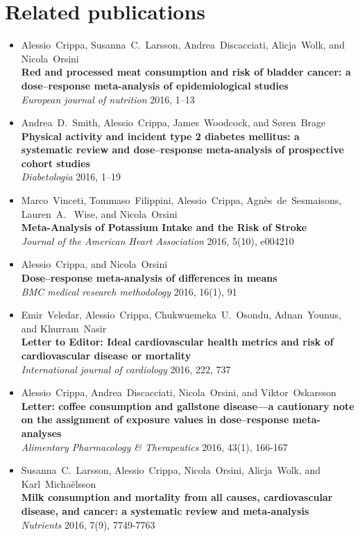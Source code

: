 \documentclass[11pt,a4paper,twoside,openany]{book}\usepackage{knitr}
\begin{document}
{\chapter*{Related publications}
\begin{itemize}
\item Alessio~Crippa, Susanna~C.~Larsson, Andrea~Discacciati, Alicja~Wolk, and Nicola~Orsini \\ \textbf{Red and processed meat consumption and risk of bladder cancer: a dose--response meta-analysis of epidemiological studies} \\ \textit{European journal of nutrition} 2016, 1--13
\item Andrea~D.~Smith, Alessio~Crippa, James~Woodcock, and S{\o}ren~Brage \\ \textbf{Physical activity and incident type 2 diabetes mellitus: a systematic review and dose--response meta-analysis of prospective cohort studies} \\ \textit{Diabetologia} 2016, 1--19
\item Marco~Vinceti, Tommaso~Filippini, Alessio~Crippa, Agn{\`e}s~de~Sesmaisons, Lauren~A.~ Wise, and Nicola~Orsini \\ \textbf{Meta-Analysis of Potassium Intake and the Risk of Stroke} \\ \textit{Journal of the American Heart Association} 2016, 5(10), e004210
\item Alessio~Crippa, and Nicola~Orsini \\ \textbf{Dose--response meta-analysis of differences in means} \\ \textit{BMC medical research methodology} 2016, 16(1), 91
\item Emir~Veledar, Alessio~Crippa, Chukwuemeka~U.~Osondu, Adnan~Younus, and Khurram~Nasir \\ \textbf{Letter to Editor: Ideal cardiovascular health metrics and risk of cardiovascular disease or mortality} \\ \textit{International journal of cardiology} 2016, 222, 737
\item Alessio~Crippa, Andrea~Discacciati, Nicola~Orsini, and Viktor~Oskarsson \\ \textbf{Letter: coffee consumption and gallstone disease---a cautionary note on the assignment of exposure values in dose--response meta-analyses} \\ \textit{Alimentary Pharmacology \& Therapeutics} 2016, 43(1), 166-167
\item Susanna~C.~Larsson, Alessio~Crippa, Nicola~Orsini, Alicja~Wolk, and Karl~Micha{\"e}lsson \\ \textbf{Milk consumption and mortality from all causes, cardiovascular disease, and cancer: a systematic review and meta-analysis} \\ \textit{Nutrients} 2016, 7(9), 7749-7763

\end{itemize}}
\end{document}
